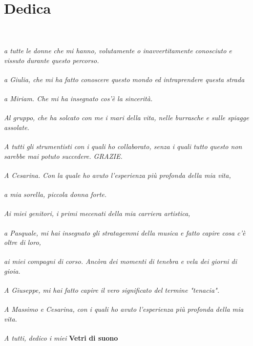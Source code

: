 
\chapter*{Dedica}


\textit{
\\
\\
a tutte le donne che mi hanno, volutamente o inavvertitamente conosciuto e vissuto durante questo percorso. \\
\\
a Giulia, che mi ha fatto conoscere questo mondo ed intraprendere questa strada \\
\\
a Miriam. Che mi ha insegnato cos'è la sincerità. \\
\\
Al gruppo, che ha solcato con me i mari della vita, nelle burrasche e sulle spiagge assolate. \\
\\
A tutti gli strumentisti con i quali ho collaborato, senza i quali tutto questo non sarebbe mai potuto succedere. GRAZIE. \\
\\
A Cesarina. Con la quale ho avuto l'esperienza più profonda della mia vita, \\
\\
a mia sorella, piccola donna forte. \\
\\
Ai miei genitori, i primi mecenati della mia carriera artistica, \\
\\
a Pasquale, mi hai insegnato gli stratagemmi della musica e fatto capire cosa c'è oltre di loro, \\
\\
ai miei compagni di corso. Ancòra dei momenti di tenebra e vela dei giorni di gioia. \\
\\
A Giuseppe, mi hai fatto capire il vero significato del termine "tenacia". \\
\\
A Massimo e Cesarina, con i quali ho avuto l'esperienza più profonda della mia vita. \\
\\
A tutti, dedico i miei} \textbf{Vetri di suono} \\
\\